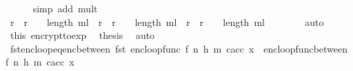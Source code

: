 \begin{isabellebody}
\ \ \ \ \isamarkupfalse%
\ {\isacharparenleft}{\kern0pt}simp\ add{\isacharcolon}{\kern0pt}\ mult{\isacharunderscore}{\kern0pt}{}{\isacharparenright}{\kern0pt}\isanewline
\ \ \isamarkupfalse%
\ \isamarkupfalse%
\ {\isachardoublequoteopen}{\isacharparenleft}{\kern0pt}{\isacharparenleft}{\kern0pt}{\isacharparenleft}{\kern0pt}r\ {\isacharasterisk}{\kern0pt}\ r{\isacharparenright}{\kern0pt}\ {\isacharcircum}{\kern0pt}\ {\isacharparenleft}{\kern0pt}{}\ {\isacharcircum}{\kern0pt}\ {\isacharparenleft}{\kern0pt}length\ m{\isacharunderscore}{\kern0pt}l{\isacharparenright}{\kern0pt}{\isacharparenright}{\kern0pt}{\isacharparenright}{\kern0pt}\ {\isacharasterisk}{\kern0pt}\ {\isacharparenleft}{\kern0pt}{\isacharparenleft}{\kern0pt}r\ {\isacharasterisk}{\kern0pt}\ r{\isacharparenright}{\kern0pt}\ {\isacharcircum}{\kern0pt}\ {\isacharparenleft}{\kern0pt}{}\ {\isacharcircum}{\kern0pt}\ {\isacharparenleft}{\kern0pt}length\ m{\isacharunderscore}{\kern0pt}l{\isacharparenright}{\kern0pt}{\isacharparenright}{\kern0pt}{\isacharparenright}{\kern0pt}{\isacharparenright}{\kern0pt}\ {\isacharequal}{\kern0pt}\ {\isacharparenleft}{\kern0pt}r\ {\isacharasterisk}{\kern0pt}\ r{\isacharparenright}{\kern0pt}\ {\isacharcircum}{\kern0pt}\ {\isacharparenleft}{\kern0pt}{}\ {\isacharcircum}{\kern0pt}\ {\isacharparenleft}{\kern0pt}length\ m{\isacharunderscore}{\kern0pt}l\ {\isacharplus}{\kern0pt}\ {}{\isacharparenright}{\kern0pt}{\isacharparenright}{\kern0pt}{\isachardoublequoteclose}\isanewline
\ \ \ \ \isamarkupfalse%
\ auto\isanewline
\ \ \isamarkupfalse%
\ this\ encrypt{\isacharunderscore}{\kern0pt}to{\isacharunderscore}{\kern0pt}exp\ \isamarkupfalse%
\ {\isacharquery}{\kern0pt}thesis\ \isamarkupfalse%
\ auto\isanewline
{}\isamarkupfalse%
%
\endisatagproof
{\isafoldproof}%
%
\isadelimproof
\isanewline
%
\endisadelimproof
\isanewline
{}\isamarkupfalse%
\ fst{\isacharunderscore}{\kern0pt}enc{\isacharunderscore}{\kern0pt}loop{\isacharunderscore}{\kern0pt}eq{\isacharunderscore}{\kern0pt}enc{\isacharunderscore}{\kern0pt}between{\isacharcolon}{\kern0pt}\ {\isachardoublequoteopen}fst\ {\isacharparenleft}{\kern0pt}enc{\isacharunderscore}{\kern0pt}loop{\isacharunderscore}{\kern0pt}func\ {\isacharparenleft}{\kern0pt}f{\isacharcomma}{\kern0pt}\ n{\isacharcomma}{\kern0pt}\ h{\isacharcomma}{\kern0pt}\ m{\isacharparenright}{\kern0pt}\ c{\isacharunderscore}{\kern0pt}acc\ x{\isacharparenright}{\kern0pt}\ {\isacharequal}{\kern0pt}\ enc{\isacharunderscore}{\kern0pt}loop{\isacharunderscore}{\kern0pt}func{\isacharunderscore}{\kern0pt}between\ {\isacharparenleft}{\kern0pt}f{\isacharcomma}{\kern0pt}\ n{\isacharcomma}{\kern0pt}\ h{\isacharcomma}{\kern0pt}\ m{\isacharparenright}{\kern0pt}\ c{\isacharunderscore}{\kern0pt}acc\ x{\isachardoublequoteclose}\isanewline

\end{isabellebody}
